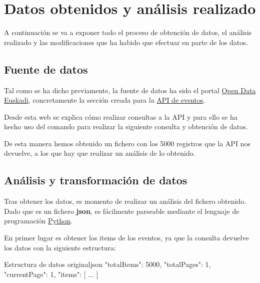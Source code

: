 \documentclass{\ClassPath/viu-tfm-template}
\begin{document}
\chapter{Datos obtenidos y análisis realizado}

A continuación se va a exponer todo el proceso de obtención de datos, el análisis realizado y las modificaciones que ha habido que efectuar en parte de los datos.

\section{Fuente de datos}
Tal como se ha dicho previamente, la fuente de datos ha sido el portal \href{https://www.opendata.euskadi.eus/inicio/}{Open Data Euskadi}, concretamente la sección creada para la \href{https://www.opendata.euskadi.eus/api-culture/?api=culture_events}{API de eventos}.

Desde esta web se explica cómo realizar consultas a la API y para ello se ha hecho uso del comando  para realizar la siguiente consulta y obtención de datos.


De esta manera hemos obtenido un fichero  con los 5000 registros que la API nos devuelve, a los que hay que realizar un análisis de lo obtenido.


\section{Análisis y transformación de datos}
Tras obtener los datos, es momento de realizar un análisis del fichero obtenido. Dado que es un fichero \textbf{json}, es fácilmente parseable mediante el lenguaje de programación \href{URLhttps://www.python.org/}{Python}.

En primer lugar es obtener los items de los eventos, ya que la consulta devuelve los datos con la siguiente estructura:

\begin{mycode}{Estructura de datos original}{json}{}
{
    "totalItems": 5000,
    "totalPages": 1,
    "currentPage": 1,
    "items": [
    {
        ...
    }]
}
\end{mycode}
\end{document}
